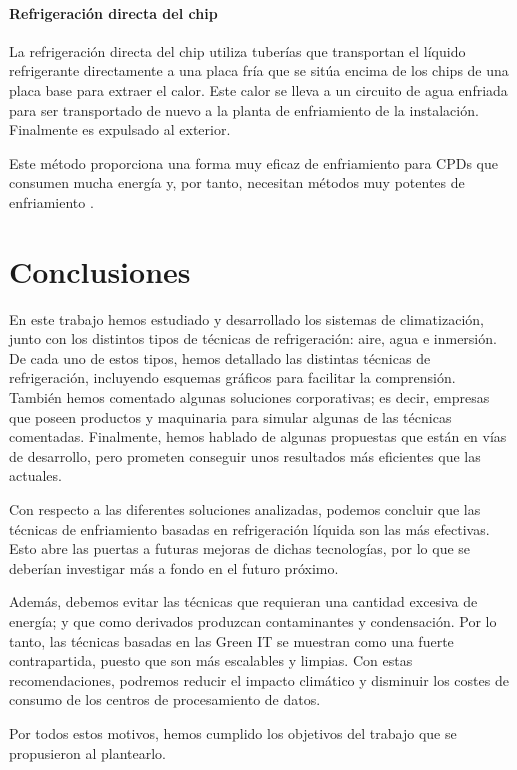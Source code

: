 \subsubsection{Refrigeración directa del chip}

La refrigeración directa del chip utiliza tuberías que transportan el líquido refrigerante directamente a una placa fría que se sitúa encima de los chips de una placa base para extraer el calor. Este calor se lleva a un circuito de agua enfriada para ser transportado de nuevo a la planta de enfriamiento de la instalación. Finalmente es expulsado al exterior.

Este método proporciona una forma muy eficaz de enfriamiento para CPDs que consumen mucha energía y, por tanto, necesitan métodos muy potentes de enfriamiento \cite{datacenters-future}.



\chapter{Conclusiones}

En este trabajo hemos estudiado y desarrollado los sistemas de climatización, junto con los distintos tipos de técnicas de refrigeración: aire, agua e inmersión. De cada uno de estos tipos, hemos detallado las distintas técnicas de refrigeración, incluyendo esquemas gráficos para facilitar la comprensión. También hemos comentado algunas soluciones corporativas; es decir, empresas que poseen productos y maquinaria para simular algunas de las técnicas comentadas. Finalmente, hemos hablado de algunas propuestas que están en vías de desarrollo, pero prometen conseguir unos resultados más eficientes que las actuales.

Con respecto a las diferentes soluciones analizadas, podemos concluir que las técnicas de enfriamiento basadas en refrigeración líquida son las más efectivas. Esto abre las puertas a futuras mejoras de dichas tecnologías, por lo que se deberían investigar más a fondo en el futuro próximo.

Además, debemos evitar las técnicas que requieran una cantidad excesiva de energía; y que como derivados produzcan contaminantes y condensación. Por lo tanto, las técnicas basadas en las Green IT se muestran como una fuerte contrapartida, puesto que son más escalables y limpias. Con estas recomendaciones, podremos reducir el impacto climático y disminuir los costes de consumo de los centros de procesamiento de datos.

Por todos estos motivos, hemos cumplido los objetivos del trabajo que se propusieron al plantearlo.
